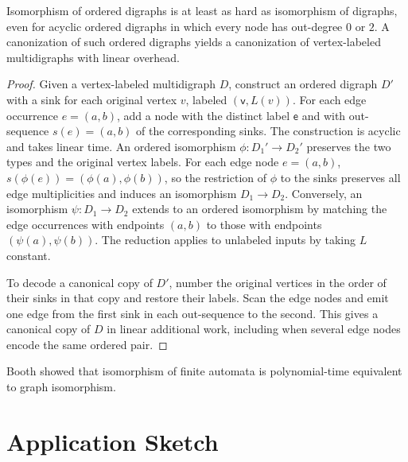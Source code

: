 \documentclass[twoside,leqno]{article}
\begin{document}
\begin{proposition}
\label{prop:ordered-gi}
Isomorphism of ordered digraphs is at least as hard as isomorphism of digraphs, even for acyclic ordered digraphs in which every node has out-degree $0$ or $2$. A canonization of such ordered digraphs yields a canonization of vertex-labeled multidigraphs with linear overhead.
\end{proposition}
\begin{proof}
Given a vertex-labeled multidigraph $D$, construct an ordered digraph $D'$ with a sink for each original vertex $v$, labeled $(\mathsf{v},L(v))$. For each edge occurrence $e=(a,b)$, add a node with the distinct label $\mathsf{e}$ and with out-sequence $s(e)=(a,b)$ of the corresponding sinks. The construction is acyclic and takes linear time. An ordered isomorphism $\phi:D_1'\to D_2'$ preserves the two types and the original vertex labels. For each edge node $e=(a,b)$, $s(\phi(e))=(\phi(a),\phi(b))$, so the restriction of $\phi$ to the sinks preserves all edge multiplicities and induces an isomorphism $D_1\to D_2$. Conversely, an isomorphism $\psi:D_1\to D_2$ extends to an ordered isomorphism by matching the edge occurrences with endpoints $(a,b)$ to those with endpoints $(\psi(a),\psi(b))$. The reduction applies to unlabeled inputs by taking $L$ constant.

To decode a canonical copy of $D'$, number the original vertices in the order of their sinks in that copy and restore their labels. Scan the edge nodes and emit one edge from the first sink in each out-sequence to the second. This gives a canonical copy of $D$ in linear additional work, including when several edge nodes encode the same ordered pair.
\end{proof}

Booth \cite{booth1978isomorphism} showed that isomorphism of finite automata is polynomial-time equivalent to graph isomorphism.

\section{Application Sketch}
\label{sec:application}
\end{document}
